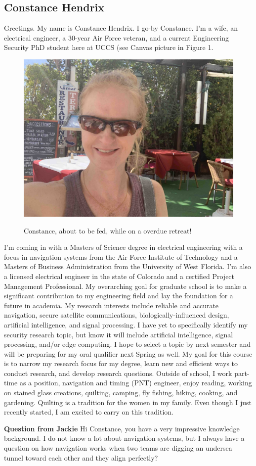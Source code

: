 
 \subsection{Constance Hendrix}
Greetings.  My name is Constance Hendrix.  I go-by Constance.  I’m a wife, an electrical engineer, a 30-year Air Force veteran, and a current Engineering Security PhD student here at UCCS (see Canvas picture in Figure 1. 
\begin{figure}[h]
    \centering
    \includegraphics[scale=0.06]{hendrix_canvas.jpg}
    \label{fig:me}
    \caption{Constance, about to be fed, while on a overdue retreat!}
\end{figure}
I’m coming in with a Masters of Science degree in electrical engineering with a focus in navigation systems from the Air Force Institute of Technology and a Masters of Business Administration from the University of West Florida.  I'm also a licensed electrical engineer in the state of Colorado and a certified Project Management Professional. My overarching goal for graduate school is to make a significant contribution to my engineering field and lay the foundation for a future in academia.  My research interests include reliable and accurate navigation, secure satellite communications, biologically-influenced design, artificial intelligence, and signal processing.  I have yet to specifically identify my security research topic, but know it will include artificial intelligence, signal processing, and/or edge computing. I hope to select a topic by next semester and will be preparing for my oral qualifier next Spring as well.  My goal for this course is to narrow my research focus for my degree, learn new and efficient ways to conduct research, and develop research questions. Outside of school, I work part-time as a position, navigation and timing (PNT) engineer, enjoy reading, working on stained glass creations, quilting, camping, fly fishing, hiking, cooking, and gardening.  Quilting is a tradition for the women in my family.  Even though I just recently started, I am excited to carry on this tradition.

\textbf{Question from Jackie}
Hi Constance, you have a very impressive knowledge background. I do not know a lot about navigation systems, but I always have a question on how navigation works when two teams are digging an undersea tunnel toward each other and they align perfectly?

